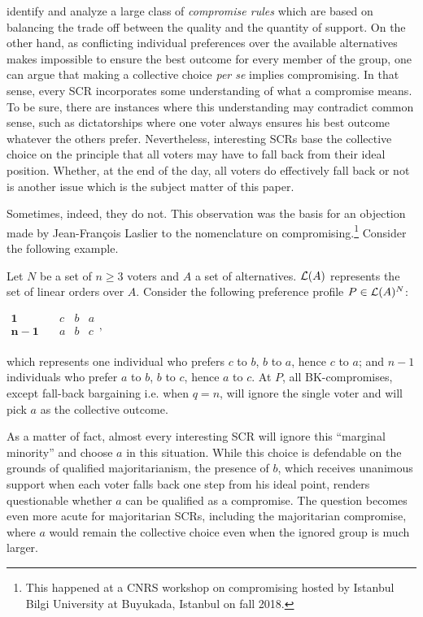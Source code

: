\documentclass[version=3.21, pagesize, twoside=off, bibliography=totoc, DIV=calc, fontsize=12pt, a4paper]{scrartcl}
\begin{document}
\cite{Merlin2019} identify and analyze a large class of \textit{compromise rules} which are based on balancing the trade off between the quality and the quantity of support. On the other hand, as conflicting
individual preferences over the available alternatives makes impossible to ensure the best outcome for every member of the group, one can argue that making a collective choice \textit{per se} implies compromising. In that sense, every SCR incorporates some understanding of what a compromise means. To be sure, there are instances where this understanding may contradict common sense, such as dictatorships where one voter always ensures his best outcome whatever the others prefer. Nevertheless, interesting SCRs base the collective choice on the principle that all voters may have to fall back from their ideal position. Whether, at the end of the day, all voters do effectively fall back or not is another issue which is the subject matter of this paper.

Sometimes, indeed, they do not. This observation was the basis for an objection made by Jean-François Laslier to the nomenclature on compromising.\footnote{This happened at a CNRS workshop on compromising hosted by Istanbul Bilgi University at Buyukada, Istanbul on fall 2018.} Consider the following example.
\begin{example}
	\label{ex:ex1}
	Let $N$ be a set of $n ≥ 3$ voters and $A$ a set of alternatives. $\mathcal{L}(A)$ represents the set of linear orders over $A$. Consider the following preference profile $P\in \mathcal{L}(A)^{N}$:
	\begin{center}
		$
		\begin{array}{cccc}
		\mathbf{1} \quad &c&b&a\\
		\mathbf{n-1} \quad &a&b&c\\
		\end{array},
		$
	\end{center}
	which represents one individual who prefers $c$ to $b$, $b$ to $a$, hence $c$ to $a$; and $n-1$ individuals who prefer $a$ to $b$, $b$ to $c$, hence $a$ to $c$. At $P$, all BK-compromises, except fall-back bargaining i.e. when $q=n$, will ignore the single voter and will pick $a$ as the collective outcome.
\end{example}

As a matter of fact, almost every interesting SCR will ignore this “marginal minority” and choose $a$ in this situation. While this choice is defendable on the grounds of qualified majoritarianism, the presence of $b$, which receives unanimous support when each voter falls back one step from his ideal point, renders questionable whether $a$ can be qualified as a compromise. The question becomes even more acute for majoritarian SCRs, including the majoritarian compromise, where $a$ would
remain the collective choice even when the ignored group is much larger.
\end{document}
